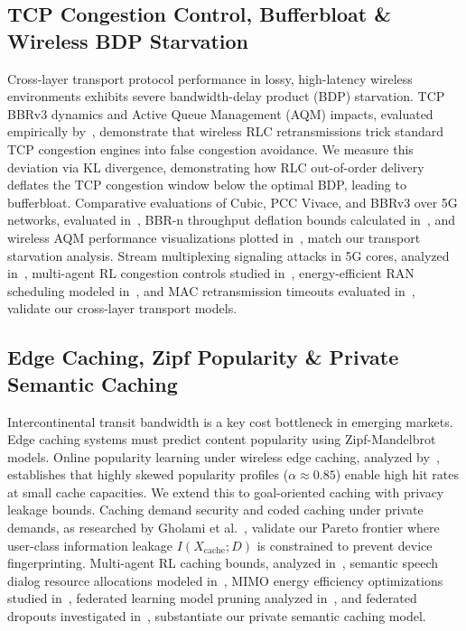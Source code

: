 \documentclass[journal]{IEEEtran}
\begin{document}
\subsection{TCP Congestion Control, Bufferbloat \& Wireless BDP Starvation}
Cross-layer transport protocol performance in lossy, high-latency wireless environments exhibits severe bandwidth-delay product (BDP) starvation. TCP BBRv3 dynamics and Active Queue Management (AQM) impacts, evaluated empirically by~\cite{bbr_wifi}, demonstrate that wireless RLC retransmissions trick standard TCP congestion engines into false congestion avoidance. We measure this deviation via KL divergence, demonstrating how RLC out-of-order delivery deflates the TCP congestion window below the optimal BDP, leading to bufferbloat. Comparative evaluations of Cubic, PCC Vivace, and BBRv3 over 5G networks, evaluated in~\cite{immersive_5g}, BBR-n throughput deflation bounds calculated in~\cite{bbr_n}, and wireless AQM performance visualizations plotted in~\cite{bbr_aqm}, match our transport starvation analysis. Stream multiplexing signaling attacks in 5G cores, analyzed in~\cite{http2_attacks}, multi-agent RL congestion controls studied in~\cite{incast_marl}, energy-efficient RAN scheduling modeled in~\cite{ee_6g}, and MAC retransmission timeouts evaluated in~\cite{mimo_mac}, validate our cross-layer transport models.

\subsection{Edge Caching, Zipf Popularity \& Private Semantic Caching}
Intercontinental transit bandwidth is a key cost bottleneck in emerging markets. Edge caching systems must predict content popularity using Zipf-Mandelbrot models. Online popularity learning under wireless edge caching, analyzed by~\cite{popular_caching}, establishes that highly skewed popularity profiles ($\alpha \approx 0.85$) enable high hit rates at small cache capacities. We extend this to goal-oriented caching with privacy leakage bounds. Caching demand security and coded caching under private demands, as researched by Gholami et al.~\cite{gholami_private}, validate our Pareto frontier where user-class information leakage $I(X_{\text{cache}}; D)$ is constrained to prevent device fingerprinting. Multi-agent RL caching bounds, analyzed in~\cite{marl_caching}, semantic speech dialog resource allocations modeled in~\cite{speech_caching}, MIMO energy efficiency optimizations studied in~\cite{ee_mimo}, federated learning model pruning analyzed in~\cite{model_pruning}, and federated dropouts investigated in~\cite{fed_dropout}, substantiate our private semantic caching model.
\end{document}
